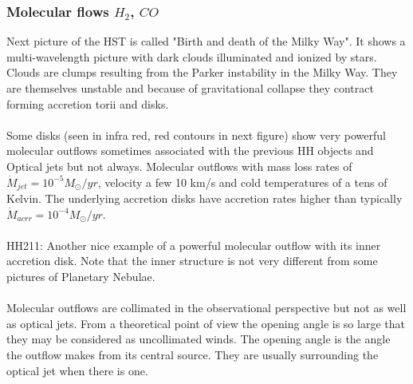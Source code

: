 \documentclass[10pt,a4paper,english]{article}
\begin{document}
\subsubsection{Molecular flows $H_2$, $CO$}
Next picture of the HST is called "Birth and death of the Milky Way". It shows a multi-wavelength picture with dark clouds illuminated and ionized by stars. Clouds are clumps resulting from the Parker instability in the Milky Way. They are themselves unstable and because of gravitational collapse they contract forming accretion torii and disks.\\
\\
Some disks (seen in infra red, red contours in next figure) show very powerful molecular outflows sometimes associated with the previous HH objects and Optical jets but not always. Molecular outflows with mass loss rates of $\dot{M}_{jet}=10^{-5}M_{\odot} /yr$, velocity a few 10 km/s and cold temperatures of a tens of Kelvin. The underlying accretion disks have accretion rates higher than typically $\dot{M}_{acrr}=10^{-4}M_{\odot} /yr$.\\
\\
HH211: Another nice example of a powerful molecular outflow with its inner accretion disk. Note that the inner structure is not very different from some pictures of Planetary Nebulae.\\
\\
Molecular outflows are collimated in the observational perspective but not as well as optical jets. From a theoretical point of view the opening angle is so large that they may be considered as uncollimated winds. The opening angle is the angle the outflow makes from its central source. They are usually surrounding the optical jet when there is one.
\end{document}
